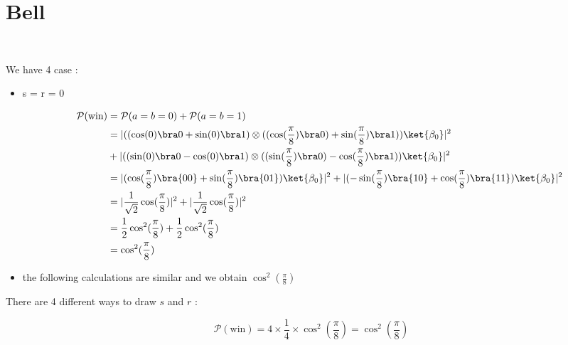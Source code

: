 \section{Bell}

~

We have 4 case :

\begin{itemize}
  \item s = r = 0

    \begin{align*}
      \mathcal P(\text{win}) &= \mathcal P(a = b = 0) + \mathcal P(a = b = 1) \\
      &= |((\cos(0) \bra 0 + \sin(0) \bra 1) \otimes
          ((\cos(\frac \pi 8) \bra 0) + \sin(\frac \pi 8) \bra 1)) \ket{\beta_0}|^2
          \\
      &+ |((\sin(0) \bra 0 - \cos(0) \bra 1) \otimes
          ((\sin(\frac \pi 8) \bra 0) - \cos(\frac \pi 8) \bra 1))\ket{\beta_0}|^2
          \\
      &= |(\cos(\frac \pi 8)\bra{00} + \sin(\frac \pi 8)\bra{01}) \ket{\beta_0}|^2
      + |(-\sin(\frac \pi 8)\bra{10} + \cos(\frac \pi 8)\bra{11}) \ket{\beta_0}|^2
      \\
      &= |\frac{1}{\sqrt 2} \cos(\frac \pi 8)|^2 +
         |\frac{1}{\sqrt 2} \cos(\frac \pi 8)|^2 \\
      &= \frac 1 2 \cos^2(\frac \pi 8) + \frac 1 2 \cos^2(\frac \pi 8) \\
      &= \cos^2(\frac \pi 8)
    \end{align*}

  \item the following calculations are similar and we obtain
    $\cos^2(\frac \pi 8)$
\end{itemize}

There are 4 different ways to draw $s$ and $r$ :

$$ \mathcal P(\text{win}) = 4 \times \frac 1 4 \times \cos^2(\frac \pi 8)
= \cos^2(\frac \pi 8)$$
